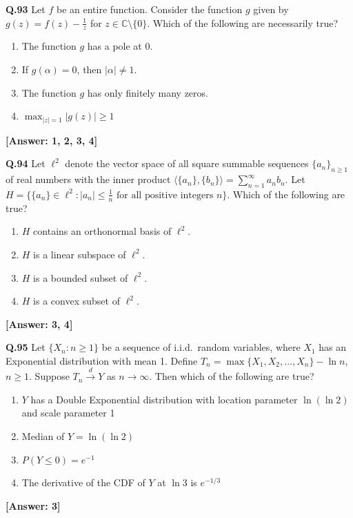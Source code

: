 \documentclass[12pt,a4paper]{article}
\newcommand{\ans}[1]{\quad\textcolor{anscolor}{\textbf{[Answer: #1]}}}
\begin{document}
\textbf{Q.93} Let $f$ be an entire function. Consider the function $g$ given by $g(z)=f(z)-\tfrac{1}{z}$ for $z\in\mathbb{C}\setminus\{0\}$. Which of the following are necessarily true?
\begin{enumerate}[label=\arabic*.]
\item The function $g$ has a pole at 0.
\item If $g(\alpha)=0$, then $|\alpha|\neq1$.
\item The function $g$ has only finitely many zeros.
\item $\max_{|z|=1}|g(z)|\ge1$
\end{enumerate}\ans{1, 2, 3, 4}

\textbf{Q.94} Let $\ell^2$ denote the vector space of all square summable sequences $\{a_n\}_{n\ge1}$ of real numbers with the inner product $\langle\{a_n\},\{b_n\}\rangle=\sum_{n=1}^\infty a_nb_n$. Let $H=\bigl\{\{a_n\}\in\ell^2:|a_n|\le\tfrac{1}{n}\text{ for all positive integers }n\bigr\}$. Which of the following are true?
\begin{enumerate}[label=\arabic*.]
\item $H$ contains an orthonormal basis of $\ell^2$. \item $H$ is a linear subspace of $\ell^2$.
\item $H$ is a bounded subset of $\ell^2$. \item $H$ is a convex subset of $\ell^2$.
\end{enumerate}\ans{3, 4}

\textbf{Q.95} Let $\{X_n:n\ge1\}$ be a sequence of i.i.d.\ random variables, where $X_1$ has an Exponential distribution with mean 1. Define $T_n=\max\{X_1,X_2,\ldots,X_n\}-\ln n$, $n\ge1$. Suppose $T_n\xrightarrow{d}Y$ as $n\to\infty$. Then which of the following are true?
\begin{enumerate}[label=\arabic*.]
\item $Y$ has a Double Exponential distribution with location parameter $\ln(\ln2)$ and scale parameter 1
\item Median of $Y=\ln(\ln2)$
\item $P(Y\le0)=e^{-1}$
\item The derivative of the CDF of $Y$ at $\ln3$ is $e^{-1/3}$
\end{enumerate}\ans{3}
\end{document}
